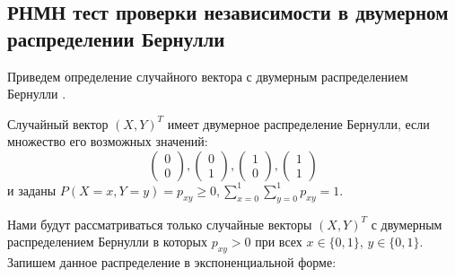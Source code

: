 \subsection{РНМН тест проверки независимости в двумерном
распределении Бернулли}\label{bivariate_umpu}


Приведем определение случайного вектора с 
двумерным распределением Бернулли \cite{Dai2013}.
\begin{definition}
    Случайный вектор $(X,Y)^T$ имеет двумерное распределение Бернулли,
    если множество его возможных значений:
    $$
        \begin{pmatrix}
            0 \\
            0
        \end{pmatrix},
        \begin{pmatrix}
            0 \\
            1
        \end{pmatrix},
        \begin{pmatrix}
            1 \\
            0
        \end{pmatrix},
        \begin{pmatrix}
            1 \\
            1
        \end{pmatrix}
    $$ и заданы $P(X=x,Y=y)=p_{xy} \geq 0,  \sum_{x=0}^1 \sum_{y=0}^1 p_{xy} =1$.
\end{definition}
Нами будут рассматриваться только случайные
векторы $(X,Y)^T$ с двумерным распределением Бернулли
в которых $p_{xy} > 0$ при всех
$x \in \{0,1\}$, $y\in \{0,1\}$.
Запишем данное распределение в экспоненциальной форме:
